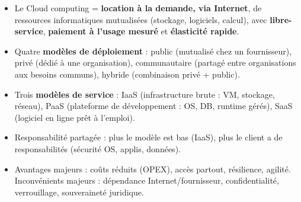 \documentclass[11pt]{article}
\newcommand{\cle}[1]{{\popxbold\color{popdark}#1}}
\begin{document}
\begin{aretenir}
\begin{itemize}
\item Le Cloud computing = \textbf{location à la demande, via Internet}, de ressources informatiques mutualisées (stockage, logiciels, calcul), avec \textbf{libre-service}, \textbf{paiement à l'usage mesuré} et \textbf{élasticité rapide}.
\item Quatre \textbf{modèles de déploiement} : \cle{public} (mutualisé chez un fournisseur), \cle{privé} (dédié à une organisation), \cle{communautaire} (partagé entre organisations aux besoins communs), \cle{hybride} (combinaison privé + public).
\item Trois \textbf{modèles de service} : \cle{IaaS} (infrastructure brute : VM, stockage, réseau), \cle{PaaS} (plateforme de développement : OS, DB, runtime gérés), \cle{SaaS} (logiciel en ligne prêt à l'emploi).
\item Responsabilité partagée : plus le modèle est bas (IaaS), plus le client a de responsabilités (sécurité OS, applis, données).
\item Avantages majeurs : coûts réduits (OPEX), accès partout, résilience, agilité. Inconvénients majeurs : dépendance Internet/fournisseur, confidentialité, verrouillage, souveraineté juridique.
\end{itemize}
\end{aretenir}
\end{document}
